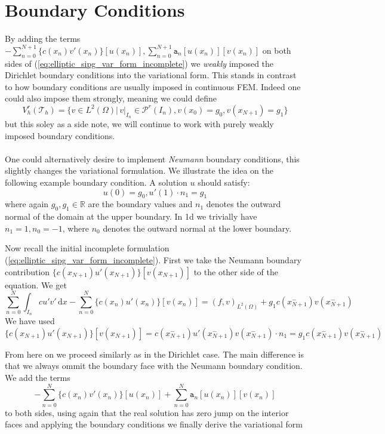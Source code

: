 \section{Boundary Conditions}
By adding the terms $-\sum_{n=0}^{N+1} \{c(x_n)v'(x_n)\}[u(x_n)], \sum_{n=0}^{N+1} \texttt{a}_n[u(x_n)][v(x_n)]$ on both sides
of (\ref{eq:elliptic_sipg_var_form_incomplete}) we \textit{weakly} imposed the Dirichlet
boundary conditions into the variational form. This stands in contrast to how boundary
conditions are usually imposed in continuous FEM. Indeed one could also impose them strongly,
meaning we could define
\begin{equation*}
	V_h^r(\mathcal{T}_h) = \{v \in L^2(\Omega) |\, v|_{I_n} \in \mathcal{P}^r(I_n), v(x_0)=g_0, v(x_{N+1})=g_1 \}
\end{equation*}
but this soley as a side note, we will continue to work with purely weakly imposed
boundary conditions.  \\ \\

One could alternatively desire to implement \textit{Neumann} boundary conditions, this slightly changes the variational formulation.
We illustrate the idea on the following example boundary condition. A solution
$u$ should satisfy:
\[
	u(0) = g_{0}, u'(1)\cdot n_1 = g_{1}
\]
where again $g_0, g_1 \in \mathbb{R}$ are the boundary values and $n_1$ denotes the outward normal
of the domain at the upper boundary. In 1d we trivially have $n_1 = 1, n_0 = -1$, where $n_0$ denotes the outward
normal at the lower boundary.

Now recall the initial incomplete formulation (\ref{eq:elliptic_sipg_var_form_incomplete}). First we take the
Neumann boundary contribution $\{c(x_{N+1})u'(x_{N+1})\}[v(x_{N+1})]$ to the other side of the equation. We get
\[
	\sum_{n=0}^N \int_{I_n} cu'v'\, \text{d}x
	-\sum_{n=0}^{N} \{c(x_n)u'(x_n)\}[v(x_n)] = (f,v)_{L^2(\Omega)}
	+ g_1c(x_{N+1}^-)v(x_{N+1}^-)
\]
We have used $\{c(x_{N+1})u'(x_{N+1})\}[v(x_{N+1})] = c(x_{N+1}^-)u'(x_{N+1}^-)v(x_{N+1}^-)\cdot n_1 = g_1 c(x_{N+1}^-)v(x_{N+1}^-)$

From here on
we proceed similarly as in the Dirichlet case. The main difference is that we always ommit the boundary face with the Neumann
boundary condition. \\
We add the terms
\[
	-\sum_{n=0}^{N} \{c(x_n)v'(x_n)\}[u(x_n)]
	+\sum_{n=0}^{N} \texttt{a}_n[u(x_n)][v(x_n)]
\]
to both sides, using again that the real solution has zero jump on the interior faces and
applying the boundary conditions we finally derive the variational form

